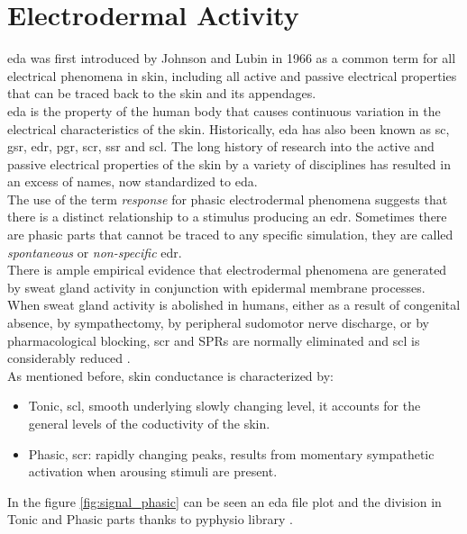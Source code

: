 \section{Electrodermal Activity}
\gls{eda} was first introduced by Johnson and Lubin in 1966 \cite{johnson1996} as a common term for all electrical phenomena in skin, including all active and passive electrical properties that can be traced back to the skin and its appendages.
\\
\gls{eda} is the property of the human body that causes continuous variation in the electrical characteristics of the skin. Historically, \gls{eda} has also been known as \gls{sc}, \gls{gsr}, \gls{edr}, \gls{pgr}, \gls{scr}, \gls{ssr} and \gls{scl}. The long history of research into the active and passive electrical properties of the skin by a variety of disciplines has resulted in an excess of names, now standardized to \gls{eda}.
\\ \indent
The use of the term \textit{response} for phasic electrodermal phenomena suggests that there is a distinct relationship to a stimulus producing an \gls{edr}. Sometimes there are phasic parts that cannot be traced to any specific simulation, they are called \textit{spontaneous} or \textit{non-specific} \gls{edr}.
\\ \indent
There is ample empirical evidence that electrodermal phenomena are generated by sweat gland activity in conjunction with epidermal membrane processes. When sweat gland activity is abolished in humans, either as a result of congenital absence, by sympathectomy, by peripheral sudomotor nerve discharge, or by pharmacological blocking, \gls{scr} and SPRs are normally eliminated and \gls{scl} is considerably reduced \cite{fowles1993electrodermal}.
\\ \indent
As mentioned before, skin conductance is characterized by:
\begin{itemize}
	\item Tonic, \gls{scl}, smooth underlying slowly changing level, it accounts for the general levels of the coductivity of the skin.
	\item Phasic, \gls{scr}: rapidly changing peaks, results from momentary sympathetic activation when arousing stimuli are present.
\end{itemize}
In the figure \ref{fig:signal_phasic} can be seen an \gls{eda} file plot and the division in Tonic and Phasic parts thanks to pyphysio library \cite{bizzego2019pyphysio}.
